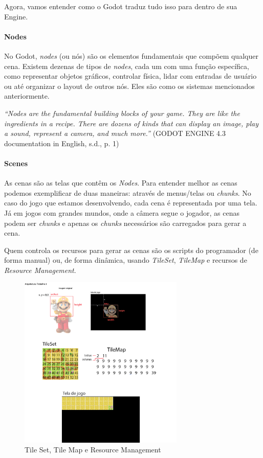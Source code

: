 Agora, vamos entender como o Godot traduz tudo isso para dentro de sua Engine.

\paragraph{Nodes}

No Godot, \textit{nodes} (ou nós) são os elementos fundamentais que compõem qualquer cena. Existem dezenas de tipos de \textit{nodes}, cada um com uma função específica, como representar objetos gráficos, controlar física, lidar com entradas de usuário ou até organizar o layout de outros nós. Eles são como os sistemas mencionados anteriormente.

\begin{flushright}
\textit{“Nodes are the fundamental building blocks of your game. They are like the ingredients in a recipe. There are dozens of kinds that can display an image, play a sound, represent a camera, and much more.”}
(GODOT ENGINE 4.3 documentation in English, s.d., p. 1)
\end{flushright}

\paragraph{Scenes}

As cenas são as telas que contêm os \textit{Nodes}. Para entender melhor as cenas podemos exemplificar de duas maneiras: através de menus/telas ou \textit{chunks}. No caso do jogo que estamos desenvolvendo, cada cena é representada por uma tela. Já em jogos com grandes mundos, onde a câmera segue o jogador, as cenas podem ser \textit{chunks} e apenas os \textit{chunks} necessários são carregados para gerar a cena. 

Quem controla os recursos para gerar as cenas são os scripts do programador (de forma manual) ou, de forma dinâmica, usando \textit{TileSet}, \textit{TileMap} e recursos de \textit{Resource Management}.

\begin{figure}[htbp]
    \centering
    \caption{Tile Set, Tile Map e Resource Management}
    \label{fig:tiles}
    \includegraphics[width=0.7\textwidth]{figuras/tile-map-cic.png}
\end{figure}